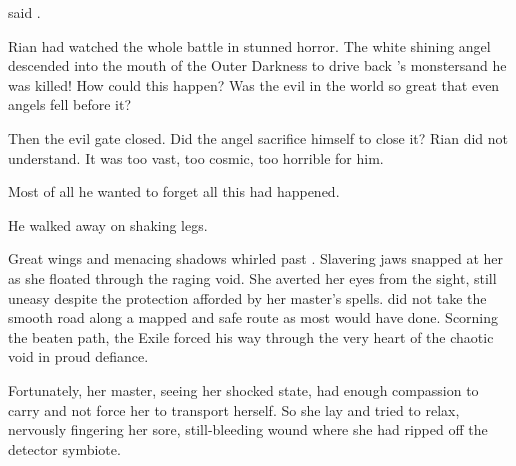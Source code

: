 said \Achsah. 



\begin{comment}
  \subsection{Rian aftermath}
\end{comment}
\new
Rian had watched the whole battle in stunned horror. 
The white shining angel descended into the mouth of the Outer Darkness to drive back \Isphet's monsters\prikker and he was killed!
How could this happen? 
Was the evil in the world so great that even angels fell before it?

Then the evil gate closed. 
Did the angel sacrifice himself to close it?
Rian did not understand. 
It was too vast, too cosmic, too horrible for him. 

Most of all he wanted to forget all this had happened. 

He walked away on shaking legs.




\begin{comment}
  \subsection{\Criseis aftermath}
\end{comment}
Great wings and menacing shadows whirled past \Criseis. 
Slavering jaws snapped at her as she floated through the raging void.
She averted her eyes from the sight, still uneasy despite the protection afforded by her master's spells. 
\Ishnaruchaefir did not take the smooth road along a mapped and safe route as most would have done.
Scorning the beaten path, the Exile forced his way through the very heart of the chaotic void in proud defiance. 

Fortunately, her master, seeing her shocked state, had enough compassion to carry \Criseis and not force her to transport herself. 
So she lay and tried to relax, nervously fingering her sore, still-bleeding wound where she had ripped off the detector symbiote.

